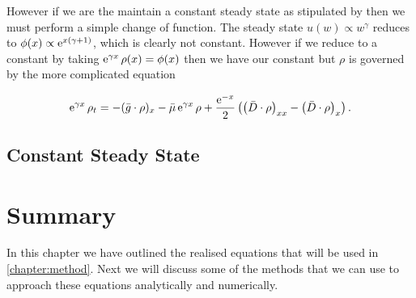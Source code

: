 \documentclass[../main]{subfiles}
\begin{document}
  However if we are the maintain a constant steady state as stipulated by \cite{sheldon1967} then we must perform a simple change of function. The steady state $u(w) \propto w^{\gamma}$ reduces to $\phi(x) \propto \operatorname{e}^{x(\gamma +1)}$, which is clearly not constant. However if we reduce to a constant by taking $\operatorname{e}^{\gamma x} \rho(x) = \phi(x)$ then we have our constant but $\rho$ is governed by the more complicated equation

  \begin{equation}
    \operatorname{e}^{\gamma x} \rho_t = - (\bar{g} \cdot \rho)_x - \bar{\mu} \operatorname{e}^{\gamma x} \rho + \frac{\operatorname{e}^{-x}}{2} \left( \left( \bar{D} \cdot \rho \right)_{xx} - \left( \bar{D} \cdot \rho \right)_x \right).
  \end{equation}

  \subsection{Constant Steady State}

  \section{Summary}
  In this chapter we have outlined the realised equations that will be used in \autoref{chapter:method}. Next we will discuss some of the methods that we can use to approach these equations analytically and numerically.
\end{document}
